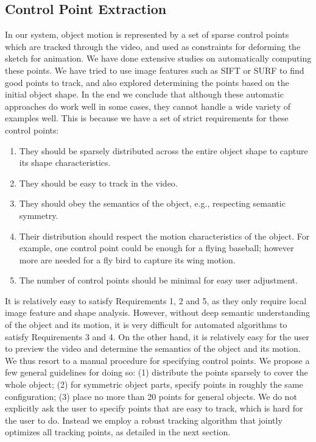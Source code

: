 \subsection{Control Point Extraction}\label{feature_extraction}

In our system, object motion is represented by a set of sparse control points which are tracked through the video, and used as constraints for deforming the sketch for animation. We have done extensive studies on automatically computing these points. 
We have tried to use image features such as SIFT or SURF to find good points to track, and also explored determining the points based on the initial object shape. 
In the end we conclude that although these automatic approaches do work well in some cases, they cannot handle a wide variety of examples well. This is because we have a set of strict requirements for these control points:
\begin{enumerate}
\item They should be sparsely distributed across the entire object shape to capture its shape characteristics.
\item They should be easy to track in the video.  
\item They should obey the semantics of the object, e.g., respecting semantic symmetry.
\item Their distribution should respect the motion characteristics of the object. For example, one control point could be enough for a flying baseball; however more are needed for a fly bird to capture its wing motion. 
\item The number of control points should be minimal for easy user adjustment.
\end{enumerate}

It is relatively easy to satisfy Requirements 1, 2 and 5, as they only require local image feature and shape analysis. However, without deep semantic understanding of the object and its motion, it is very difficult for automated algorithms to satisfy Requirements 3 and 4. 
On the other hand, it is relatively easy for the user to preview the video and determine the semantics of the object and its motion. 
We thus resort to a manual procedure for specifying control points. We propose a few general guidelines for doing so: (1) distribute the points sparsely to cover the whole object; (2) for symmetric object parts, specify points in roughly the same configuration; (3) place no more than 20 points for general objects. We do not explicitly ask the user to specify points that are easy to track, which is hard for the user to do. Instead we employ a robust tracking algorithm that jointly optimizes all tracking points, as detailed in the next section. 

